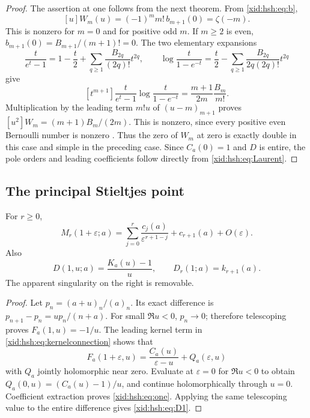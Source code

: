 \begin{proof}
The assertion at one follows from the next theorem. From
\eqref{xid:hsh:eq:b},
\[
 [u]W_m(u)=(-1)^m m!\,b_{m+1}(0)=\zeta(-m).
\]
This is nonzero for $m=0$ and for positive odd $m$. If $m\ge2$ is even,
$b_{m+1}(0)=B_{m+1}/(m+1)!=0$. The two elementary expansions
\[
 \frac{t}{e^t-1}=1-\frac t2+
       \sum_{q\ge1}\frac{B_{2q}}{(2q)!}t^{2q},\qquad
 \log\frac{t}{1-e^{-t}}
       =\frac t2-\sum_{q\ge1}
          \frac{B_{2q}}{2q(2q)!}t^{2q}
\]
give
\[
 [t^{m+1}]\frac{t}{e^t-1}\log\frac{t}{1-e^{-t}}
       =\frac{m+1}{2m}\frac{B_m}{m!}.
\]
Multiplication by the leading term $m!u$ of $(u-m)_{m+1}$ proves
$[u^2]W_m=(m+1)B_m/(2m)$. This is nonzero, since every positive even
Bernoulli number is nonzero \cite{hsh:DLMFBernoulli}. Thus the zero of
$W_m$ at zero is exactly double in this case and simple in the preceding
case. Since $C_a(0)=1$ and $D$ is entire, the pole orders and leading
coefficients follow directly from \eqref{xid:hsh:eq:Laurent}.
\end{proof}

\subsection{The principal Stieltjes point}

\begin{theorem}
\label{xid:hsh:thm:one}
For $r\ge0$,
\begin{equation}\label{xid:hsh:eq:one}
 M_r(1+\varepsilon;a)
 =\sum_{j=0}^r\frac{c_j(a)}{\varepsilon^{r+1-j}}
       +c_{r+1}(a)+O(\varepsilon).
\end{equation}
Also
\begin{equation}\label{xid:hsh:eq:D1}
 D(1,u;a)=\frac{K_a(u)-1}{u},\qquad D_r(1;a)=k_{r+1}(a).
\end{equation}
The apparent singularity on the right is removable.
\end{theorem}

\begin{proof}
Let $p_n=(a+u)_n/(a)_n$. Its exact difference is
$p_{n+1}-p_n=up_n/(n+a)$. For small $\Re u<0$, $p_n\to0$;
therefore telescoping proves $F_a(1,u)=-1/u$.
The leading kernel term in \eqref{xid:hsh:eq:kernelconnection} shows that
\[
 F_a(1+\varepsilon,u)=\frac{C_a(u)}{\varepsilon-u}
                         +Q_a(\varepsilon,u)
\]
with $Q_a$ jointly holomorphic near zero. Evaluate at $\varepsilon=0$
for $\Re u<0$ to obtain $Q_a(0,u)=(C_a(u)-1)/u$, and continue
holomorphically through $u=0$. Coefficient extraction proves
\eqref{xid:hsh:eq:one}. Applying the same telescoping value to the
entire difference gives \eqref{xid:hsh:eq:D1}.
\end{proof}

